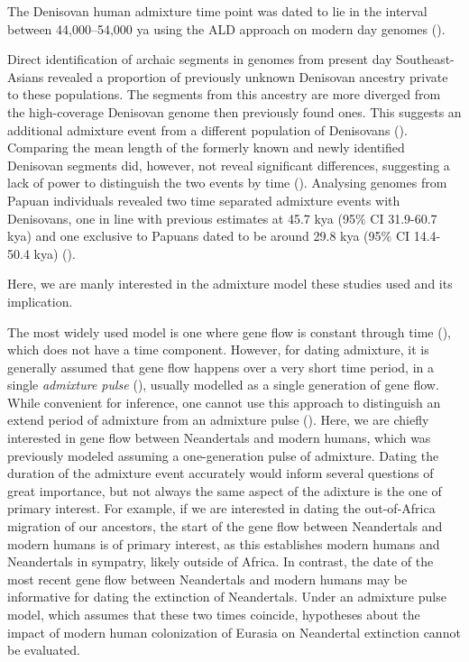 \documentclass[]{article}
\begin{document}
The Denisovan human
admixture time point was dated to lie in the interval between 44,000--54,000 ya using the ALD
approach on modern day genomes (\cite{sankararaman_combined_2016}).

Direct identification of archaic segments in genomes from present day Southeast-Asians revealed a proportion of previously unknown Denisovan ancestry private to these populations. The segments from this ancestry are more diverged from the high-coverage Denisovan genome then previously found ones. This suggests an additional admixture event from a different population of Denisovans (\cite{browning_analysis_2018}).
Comparing the mean length of the formerly known and newly identified Denisovan segments did, however, not reveal
significant differences, suggesting a lack of power to distinguish the
two events by time (\cite{browning_analysis_2018,jacobs_multiple_2019}).
Analysing genomes from Papuan individuals revealed two time separated
admixture events with Denisovans, one in line with previous estimates at
45.7 kya (95\% CI 31.9-60.7 kya) and one exclusive to Papuans dated to
be around 29.8 kya (95\% CI 14.4-50.4 kya)
(\cite{jacobs_multiple_2019}).

Here, we are manly interested in the admixture model these studies used and its implication.

The most widely used model is one where gene flow is constant through time (\cite{nielsen_distinguishing_2001,hey_multilocus_2004}), which does not have a time component. However, for dating admixture, it is generally assumed that gene flow
happens over a very short time period, in a single \textit{admixture pulse} (\cite{moorjani_history_2011}), usually modelled as a single generation
of gene flow. While convenient for inference, one cannot use this approach to distinguish an extend period of admixture from an admixture pulse (\cite{pickrell_toward_2014}). 
Here, we are chiefly interested in gene flow between Neandertals and modern humans, which was previously modeled assuming a one-generation pulse of admixture. Dating the duration of the admixture event accurately would inform several questions of  great importance, but not always the same aspect of the adixture is the one of primary interest. For example, if we are interested in dating the out-of-Africa migration of our ancestors, the start of the gene flow between Neandertals and modern humans is of primary interest, as this establishes modern humans and Neandertals in sympatry, likely outside of Africa.
In contrast, the date of the most recent gene flow between Neandertals and modern humans may be informative for dating the extinction of Neandertals. Under an admixture pulse model, which assumes that these two times coincide, hypotheses about the impact of modern human colonization of Eurasia on Neandertal extinction cannot be evaluated.
\end{document}
